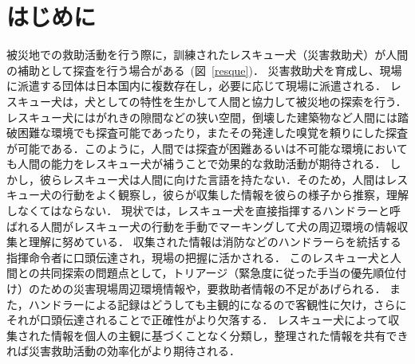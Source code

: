 \chapter{はじめに}
被災地での救助活動を行う際に，訓練されたレスキュー犬（災害救助犬）が人間の補助として探査を行う場合がある~(図~\ref{resque})．
災害救助犬を育成し、現場に派遣する団体は日本国内に複数存在し，必要に応じて現場に派遣される．
レスキュー犬は，犬としての特性を生かして人間と協力して被災地の探索を行う．
レスキュー犬にはがれきの隙間などの狭い空間，倒壊した建築物など人間には踏破困難な環境でも探査可能であったり，またその発達した嗅覚を頼りにした探査が可能である．このように，人間では探査が困難あるいは不可能な環境においても人間の能力をレスキュー犬が補うことで効果的な救助活動が期待される．
しかし，彼らレスキュー犬は人間に向けた言語を持たない．そのため，人間はレスキュー犬の行動をよく観察し，彼らが収集した情報を彼らの様子から推察，理解しなくてはならない．
現状では，レスキュー犬を直接指揮するハンドラーと呼ばれる人間がレスキュー犬の行動を手動でマーキングして犬の周辺環境の情報収集と理解に努めている．
収集された情報は消防などのハンドラーらを統括する指揮命令者に口頭伝達され，現場の把握に活かされる．
このレスキュー犬と人間との共同探索の問題点として，トリアージ（緊急度に従った手当の優先順位付け）のための災害現場周辺環境情報や，要救助者情報の不足があげられる．
また，ハンドラーによる記録はどうしても主観的になるので客観性に欠け，さらにそれが口頭伝達されることで正確性がより欠落する．
レスキュー犬によって収集された情報を個人の主観に基づくことなく分類し，整理された情報を共有できれば災害救助活動の効率化がより期待される．


